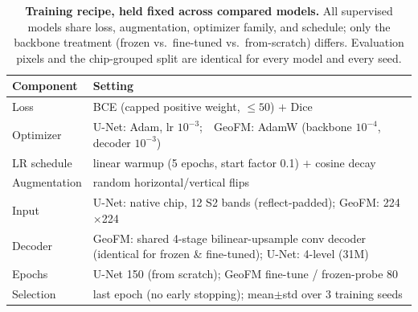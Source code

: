 \documentclass{article}
\begin{document}
\begin{table}[h]\centering\small
\caption{\textbf{Training recipe, held fixed across compared models.} All supervised
models share loss, augmentation, optimizer family, and schedule; only the backbone
treatment (frozen vs.\ fine-tuned vs.\ from-scratch) differs. Evaluation pixels and
the chip-grouped split are identical for every model and every seed.}
\label{tab:recipe}
\begin{tabular}{ll}
\toprule
Component & Setting \\
\midrule
Loss            & BCE (capped positive weight, $\le 50$) $+$ Dice \\
Optimizer       & U-Net: Adam, lr $10^{-3}$;\ \ GeoFM: AdamW (backbone $10^{-4}$, decoder $10^{-3}$) \\
LR schedule     & linear warmup (5 epochs, start factor 0.1) $+$ cosine decay \\
Augmentation    & random horizontal/vertical flips \\
Input           & U-Net: native chip, 12 S2 bands (reflect-padded); GeoFM: 224$\times$224 \\
Decoder         & GeoFM: shared 4-stage bilinear-upsample conv decoder (identical for frozen \& fine-tuned); U-Net: 4-level (31M) \\
Epochs          & U-Net 150 (from scratch); GeoFM fine-tune / frozen-probe 80 \\
Selection       & last epoch (no early stopping); mean$\pm$std over 3 training seeds \\
\bottomrule
\end{tabular}
\end{table}
\end{document}
